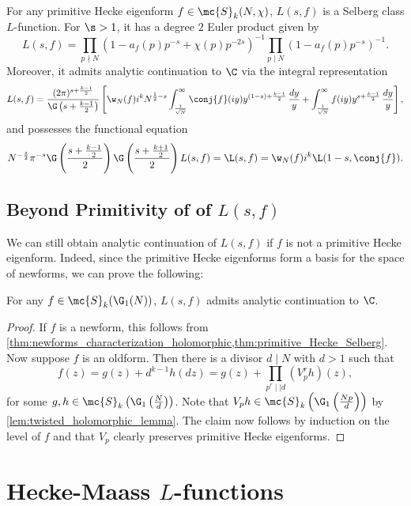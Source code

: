       \begin{theorem}\label{thm:primitive_Hecke_Selberg}
        For any primitive Hecke eigenform $f \in \mc{S}_{k}(N,\chi)$, $L(s,f)$ is a Selberg class $L$-function. For $\s > 1$, it has a degree $2$ Euler product given by 
        \[
          L(s,f) = \prod_{p \nmid N}(1-a_{f}(p)p^{-s}+\chi(p)p^{-2s})^{-1}\prod_{p \mid N}(1-a_{f}(p)p^{-s})^{-1}.
        \]
        Moreover, it admits analytic continuation to $\C$ via the integral representation
        \[
          L(s,f) = \frac{(2\pi)^{s+\frac{k-1}{2}}}{\G\left(s+\frac{k-1}{2}\right)}\left[\w_{N}(f)i^{k}N^{\frac{1}{2}-s}\int_{\frac{1}{\sqrt{N}}}^{\infty}\conj{f}(iy)y^{(1-s)+\frac{k-1}{2}}\,\frac{dy}{y}+\int_{\frac{1}{\sqrt{N}}}^{\infty}f(iy)y^{s+\frac{k-1}{2}}\,\frac{dy}{y}\right],
        \]
        and possesses the functional equation
        \[
          N^{-\frac{s}{2}}\pi^{-s}\G\left(\frac{s+\frac{k-1}{2}}{2}\right)\G\left(\frac{s+\frac{k+1}{2}}{2}\right)L(s,f) = \L(s,f) = \w_{N}(f)i^{k}\L(1-s,\conj{f}).
        \]
      \end{theorem}
    \subsection*{Beyond Primitivity of of \texorpdfstring{$L(s,f)$}{L(s,f)}}
      We can still obtain analytic continuation of $L(s,f)$ if $f$ is not a primitive Hecke eigenform. Indeed, since the primitive Hecke eigenforms form a basis for the space of newforms, we can prove the following:

      \begin{theorem}\label{thm:analytic_continuation_Hecke}
        For any $f \in \mc{S}_{k}(\G_{1}(N))$, $L(s,f)$ admits analytic continuation to $\C$.
      \end{theorem}
      \begin{proof}
        If $f$ is a newform, this follows from \cref{thm:newforms_characterization_holomorphic,thm:primitive_Hecke_Selberg}. Now suppose $f$ is an oldform. Then there is a divisor $d \mid N$ with $d > 1$ such that
        \[
          f(z) = g(z)+d^{k-1}h(dz) = g(z)+\prod_{p^{r} \mid\mid d}(V_{p}^{r}h)(z),
        \]
        for some $g,h \in \mc{S}_{k}\left(\G_{1}\left(\frac{N}{d}\right)\right)$. Note that $V_{p}h \in \mc{S}_{k}\left(\G_{1}\left(\frac{Np}{d}\right)\right)$ by \cref{lem:twisted_holomorphic_lemma}. The claim now follows by induction on the level of $f$ and that $V_{p}$ clearly preserves primitive Hecke eigenforms.
      \end{proof}
  \section{Hecke-Maass \texorpdfstring{$L$}{L}-functions}

